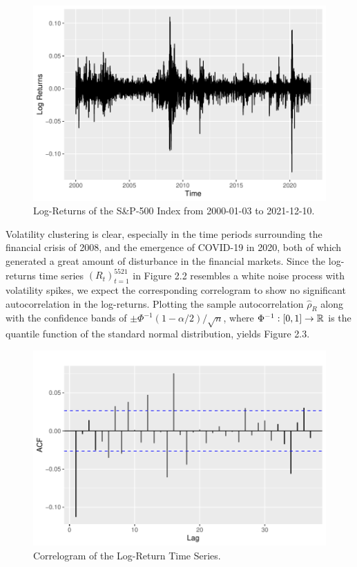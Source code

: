 \begin{figure}[H]\label{volahej}
    \centering
    \includegraphics[scale=0.7]{fig/img/log-return-ny.pdf}
    \caption{Log-Returns of the S\&P-500 Index from 2000-01-03 to 2021-12-10.}
    \label{fig:plot2}
\end{figure}
Volatility clustering is clear, especially in the time periods surrounding the financial crisis of 2008, and the emergence of COVID-19 in 2020, both of which generated a great amount of disturbance in the financial markets. Since the log-returns time series $(R_{t})_{t=1}^{5521}$ in Figure 2.2 resembles a white noise process with volatility spikes, we expect the corresponding correlogram to show no significant autocorrelation in the log-returns. Plotting the sample autocorrelation $\hat{\rho}_{R}$ along with the confidence bands of $\pm \Phi^{-1}(1-\alpha/2)/\sqrt{n}$, where $\Phi^{-1}:[0,1]\to \mathbb{R}$ is the quantile function of the standard normal distribution, yields Figure 2.3.
\begin{figure}[H]
    \centering
    \includegraphics[scale=0.7]{fig/img/nytacfplotwuhuuu.pdf}
    \caption{Correlogram of the Log-Return Time Series.}
    \label{fig:my_label}
\end{figure}
